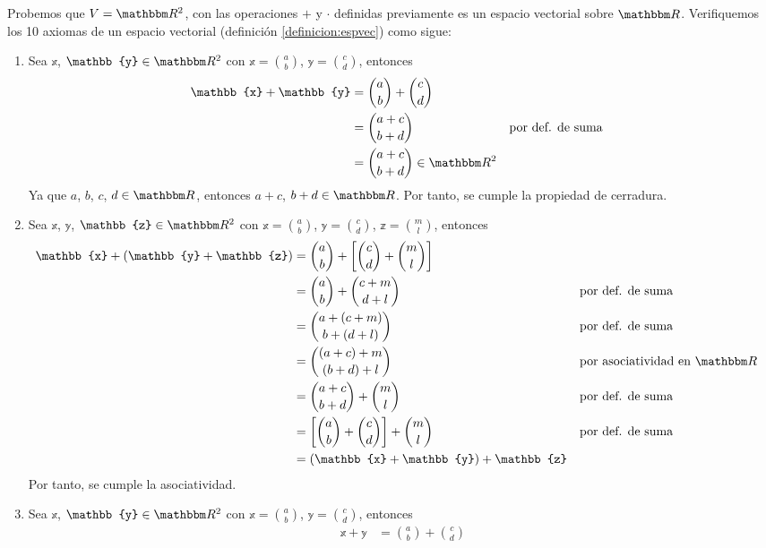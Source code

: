 \begin{example}
    Probemos que $V = \RR[2]$, con las operaciones $+$ y $\cdot$ definidas previamente es un espacio vectorial sobre $\RR$. Verifiquemos los 10 axiomas de un espacio vectorial (definición \ref{definicion:espvec}) como sigue:
    \begin{enumerate}[label=\roman*)]
        \item Sea $\mathbb{x}$, $\mathbb{y} \in \RR[2]$ con $\displaystyle \mathbb{x} = \binom{a}{b}$, $\displaystyle \mathbb{y} = \binom{c}{d}$, entonces
        \begin{align*}
            \mathbb{x} + \mathbb{y} & = \binom{a}{b} + \binom{c}{d} \\
            & = \binom{a+c}{b+d} && \text{por def. de suma} \\
            & = \binom{a+c}{b+d} \in \RR[2]
        \end{align*}
        Ya que $a$, $b$, $c$, $d \in \RR$, entonces $a+c$, $b+d \in \RR$. Por tanto, se cumple la propiedad de cerradura.
        \item Sea $\mathbb{x}$, $\mathbb{y}$, $\mathbb{z} \in \RR[2]$ con $\displaystyle \mathbb{x} = \binom{a}{b}$, $\displaystyle \mathbb{y} = \binom{c}{d}$, $\displaystyle \mathbb{z} = \binom{m}{l}$, entonces
        \begin{align*}
            \mathbb{x} + (\mathbb{y} + \mathbb{z}) & = \binom{a}{b} + \left[ \binom{c}{d} + \binom{m}{l} \right] \\
            & = \binom{a}{b} + \binom{c+m}{d+l} && \text{por def. de suma} \\
            & = \binom{a+(c+m)}{b+(d+l)} && \text{por def. de suma} \\
            & = \binom{(a+c)+m}{(b+d)+l} && \text{por asociatividad en $\RR$} \\
            & = \binom{a+c}{b+d} + \binom{m}{l} && \text{por def. de suma} \\
            & = \left[ \binom{a}{b} + \binom{c}{d} \right] + \binom{m}{l} && \text{por def. de suma} \\
            & = (\mathbb{x} + \mathbb{y}) + \mathbb{z}
        \end{align*}
        Por tanto, se cumple la asociatividad.
        \item Sea $\mathbb{x}$, $\mathbb{y} \in \RR[2]$ con $\displaystyle \mathbb{x} = \binom{a}{b}$, $\displaystyle \mathbb{y} = \binom{c}{d}$, entonces
        \begin{align*}
            \mathbb{x} + \mathbb{y} & = \binom{a}{b} + \binom{c}{d} \\

\end{align*}
\end{enumerate}
\end{example}
